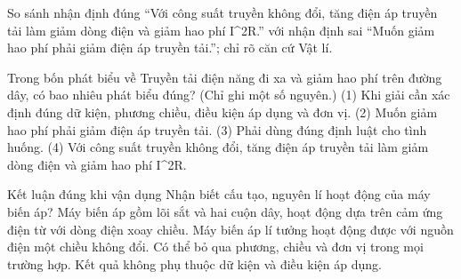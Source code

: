 \begin{bt}
So sánh nhận định đúng “Với công suất truyền không đổi, tăng điện áp truyền tải làm giảm dòng điện và giảm hao phí I^2R.” với nhận định sai “Muốn giảm hao phí phải giảm điện áp truyền tải.”; chỉ rõ căn cứ Vật lí.
\end{bt}

\begin{ex}
Trong bốn phát biểu về Truyền tải điện năng đi xa và giảm hao phí trên đường dây, có bao nhiêu phát biểu đúng? (Chỉ ghi một số nguyên.) (1) Khi giải cần xác định đúng dữ kiện, phương chiều, điều kiện áp dụng và đơn vị. (2) Muốn giảm hao phí phải giảm điện áp truyền tải. (3) Phải dùng đúng định luật cho tình huống. (4) Với công suất truyền không đổi, tăng điện áp truyền tải làm giảm dòng điện và giảm hao phí I^2R.
\end{ex}

\begin{ex}
Kết luận đúng khi vận dụng Nhận biết cấu tạo, nguyên lí hoạt động của máy biến áp?
\choice
{\True Máy biến áp gồm lõi sắt và hai cuộn dây, hoạt động dựa trên cảm ứng điện từ với dòng điện xoay chiều.}
{Máy biến áp lí tưởng hoạt động được với nguồn điện một chiều không đổi.}
{Có thể bỏ qua phương, chiều và đơn vị trong mọi trường hợp.}
{Kết quả không phụ thuộc dữ kiện và điều kiện áp dụng.}
\end{ex}

